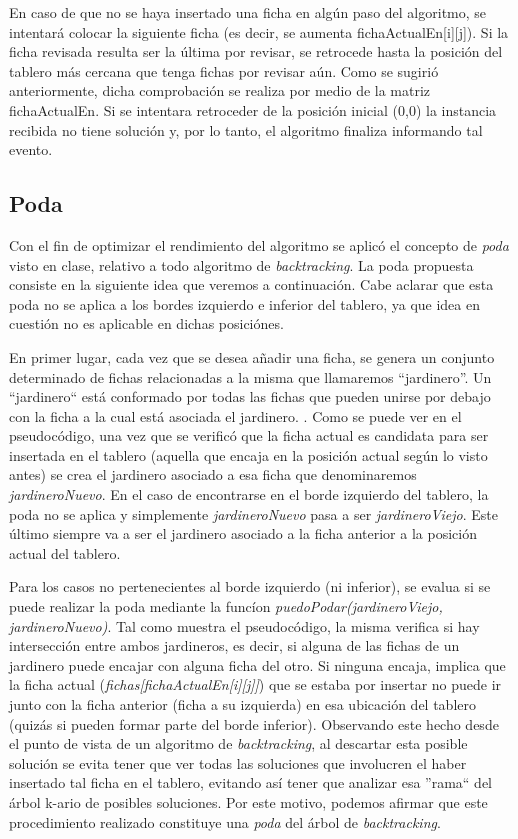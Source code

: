 \documentclass[a4paper,10pt] {article}
\begin{document}
En caso de que no se haya insertado una ficha en alg\'un paso del algoritmo, se intentar\'a colocar la siguiente ficha (es decir, se aumenta fichaActualEn[i][j]). Si la ficha revisada resulta ser la \'ultima por revisar, se retrocede hasta la posici\'on del tablero m\'as cercana que tenga fichas por revisar a\'un. Como se sugiri\'o anteriormente, dicha comprobaci\'on se realiza por medio de la matriz fichaActualEn. Si se intentara retroceder de la posici\'on inicial (0,0) la instancia recibida no tiene soluci\'on y, por lo tanto, el algoritmo finaliza informando tal evento.

\subsection*{Poda}

Con el fin de optimizar el rendimiento del algoritmo se aplicó el concepto de \textit{poda} visto en clase, relativo a todo algoritmo de \textit{backtracking}. La poda propuesta consiste en la siguiente idea que veremos a continuaci\'on. Cabe aclarar que esta poda no se aplica a los bordes izquierdo e inferior del tablero, ya que idea en cuesti\'on no es aplicable en dichas posici\'ones.

En primer lugar, cada vez que se desea añadir una ficha, se genera un conjunto determinado de fichas relacionadas a la misma que llamaremos ``jardinero''. Un ``jardinero`` est\'a conformado por todas las fichas que pueden unirse por debajo con la ficha a la cual est\'a asociada el jardinero. . Como se puede ver en el pseudoc\'odigo, una vez que se verific\'o que la ficha actual es candidata para ser insertada en el tablero (aquella que encaja en la posici\'on actual seg\'un lo visto antes) se crea el jardinero asociado a esa ficha que denominaremos \textit{jardineroNuevo}. En el caso de encontrarse en el borde izquierdo del tablero, la poda no se aplica y simplemente \textit{jardineroNuevo} pasa a ser \textit{jardineroViejo}. Este \'ultimo siempre va a ser el jardinero asociado a la ficha anterior a la posici\'on actual del tablero. 

Para los casos no pertenecientes al borde izquierdo (ni inferior), se evalua si se puede realizar la poda mediante la func\'ion \textit{puedoPodar(jardineroViejo, jardineroNuevo)}. Tal como muestra el pseudoc\'odigo, la misma verifica si hay intersecci\'on entre ambos jardineros, es decir, si alguna de las fichas de un jardinero puede encajar con alguna ficha del otro. Si ninguna encaja, implica que la ficha actual (\textit{fichas[fichaActualEn[i][j]]}) que se estaba por insertar no puede ir junto con la ficha anterior (ficha a su izquierda) en esa ubicaci\'on del tablero (quiz\'as si pueden formar parte del borde inferior). Observando este hecho desde el punto de vista de un algoritmo de \textit{backtracking}, al descartar esta posible soluci\'on se evita tener que ver todas las soluciones que involucren el haber insertado tal ficha en el tablero, evitando as\'i tener que analizar esa ''rama`` del \'arbol k-ario de posibles soluciones. Por este motivo, podemos afirmar que este procedimiento realizado constituye una \textit{poda} del \'arbol de \textit{backtracking}.
\end{document}
